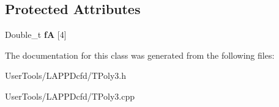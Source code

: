 \subsection*{Protected Attributes}
\begin{DoxyCompactItemize}
\item 
\hypertarget{classTPoly3_abf73a9e3bf2cbefca3e8d31344dd22ce}{Double\-\_\-t {\bfseries f\-A} \mbox{[}4\mbox{]}}\label{classTPoly3_abf73a9e3bf2cbefca3e8d31344dd22ce}

\end{DoxyCompactItemize}


The documentation for this class was generated from the following files\-:\begin{DoxyCompactItemize}
\item 
User\-Tools/\-L\-A\-P\-P\-Dcfd/T\-Poly3.\-h\item 
User\-Tools/\-L\-A\-P\-P\-Dcfd/T\-Poly3.\-cpp\end{DoxyCompactItemize}
